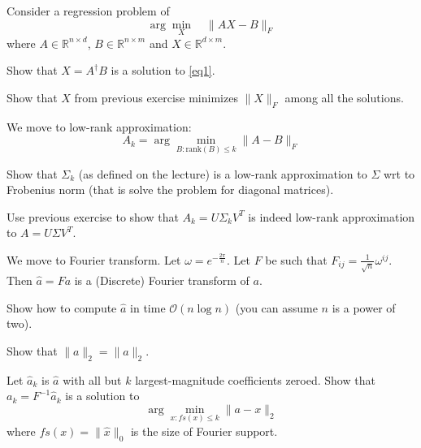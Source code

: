 \documentclass[12pt]{uebung}
\begin{document}
 

\newcommand{\bigo}{\mathcal{O}}
\renewcommand{\aufgname}{Exercise}

Consider a regression problem of 
\begin{equation}
\label{eq1}
\arg \min_{X}\quad \|AX - B\|_F
\end{equation}
where $A \in \mathbb{R}^{n \times d}$, $B \in \mathbb{R}^{n \times m}$ and $X \in \mathbb{R}^{d \times m}$.

\begin{aufg}
Show that $X = A^\dagger B$ is a solution to \eqref{eq1}.
\end{aufg}
\begin{aufg}
Show that $X$ from previous exercise minimizes $\|X\|_F$ among all the solutions.
\end{aufg}

\vspace{2cm}
We move to low-rank approximation:
$$A_k = \arg \min_{B : \text{rank}(B) \le k} \|A - B\|_F$$
\begin{aufg}
Show that $\Sigma_k$ (as defined on the lecture) is a low-rank approximation to $\Sigma$ wrt to Frobenius norm (that is solve the problem for diagonal matrices).
\end{aufg}
\begin{aufg}
Use previous exercise to show that $A_k = U \Sigma_k V^T$ is indeed low-rank approximation to $A = U \Sigma V^T$.
\end{aufg}

\vspace{2cm}

We move to Fourier transform. Let $\omega = e^{-\frac{2 \pi}{n}}$. Let $F$ be such that $F_{ij} = \frac{1}{\sqrt{n}}\omega^{ij}$. Then $\hat{a} = F a$ is a (Discrete) Fourier transform of $a$.
\begin{aufg}
Show how to compute $\hat{a}$ in time $\bigo(n \log n)$ (you can assume $n$ is a power of two).
\end{aufg}

\begin{aufg}
Show that $\|a\|_2 = \|\hat{a}\|_2$.
\end{aufg}

\begin{aufg}
Let $\hat{a}_k$ is $\hat{a}$ with all but $k$ largest-magnitude coefficients zeroed. Show that $a_k = F^{-1} \hat{a}_k$ is a solution to
$$\arg \min_{x : fs(x) \le k} \|a - x\|_2$$
where $fs(x) = \|\hat{x}\|_0$ is the size of Fourier support.
\end{aufg}
\end{document}
